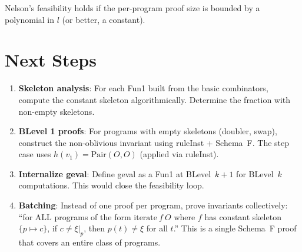 \documentclass[11pt]{article}
\begin{document}
Nelson's feasibility holds if the per-program proof size is bounded
by a polynomial in $l$ (or better, a constant).

\section{Next Steps}

\begin{enumerate}
\item \textbf{Skeleton analysis}: For each Fun1 built from the basic combinators,
compute the constant skeleton algorithmically. Determine the fraction with
non-empty skeletons.

\item \textbf{BLevel 1 proofs}: For programs with empty skeletons (doubler, swap),
construct the non-oblivious invariant using ruleInst + Schema~F.
The step case uses $h(v_1) = \mathrm{Pair}(O,O)$ (applied via ruleInst).

\item \textbf{Internalize geval}: Define geval as a Fun1 at BLevel~$k+1$
for BLevel~$k$ computations. This would close the feasibility loop.

\item \textbf{Batching}: Instead of one proof per program, prove invariants
collectively: ``for ALL programs of the form $\mathrm{iterate}\ f\ O$ where $f$
has constant skeleton $\{p \mapsto c\}$, if $c \neq \xi|_p$, then
$p(t) \neq \xi$ for all $t$.'' This is a single Schema~F proof that covers
an entire class of programs.
\end{enumerate}
\end{document}
